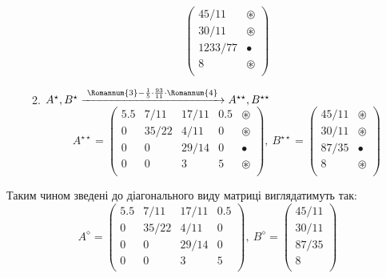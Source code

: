 \documentclass[a4paper,14pt]{extarticle} %
\begin{document}
\begin{enumerate}[Крок 1:]
\begin{enumerate}
\[\begin{pmatrix}
                45/11 & \circledast \\
                30/11 & \circledast \\
                1233/77 & \bullet \\
                8 & \circledast \\
            \end{pmatrix}
        \]
        \item $ A^{\star},B^{\star} \xrightarrow[]{\text{ \Romannum{3}}-\frac{1}{5}\cdot\frac{93}{11}\cdot\text{\Romannum{4} }} A^{\star\star},B^{\star\star} $
        \[ A^{\star\star} =
            \begin{pmatrix}
                5.5 & 7/11 & 17/11 & 0.5 & \circledast \\
                0 & 35/22 & 4/11 & 0 & \circledast \\
                0 & 0 & 29/14 & 0 & \bullet \\
                0 & 0 & 3 & 5 & \circledast \\
            \end{pmatrix},\
            B^{\star\star} = 
            \begin{pmatrix}
                45/11 & \circledast \\
                30/11 & \circledast \\
                87/35 & \bullet \\
                8 & \circledast \\
            \end{pmatrix}
        \]
    \end{enumerate}
\end{enumerate}

Таким чином зведені до діагонального виду матриці виглядатимуть так:
\begin{equation} A^{\diamond} =
    \begin{pmatrix}
        5.5 & 7/11 & 17/11 & 0.5 \\
        0 & 35/22 & 4/11 & 0 \\
        0 & 0 & 29/14 & 0 \\
        0 & 0 & 3 & 5 \\
    \end{pmatrix},\
    B^{\diamond} = 
    \begin{pmatrix}
        45/11 \\
        30/11 \\
        87/35 \\
        8 \\
    \end{pmatrix} \label{diagonal}
\end{equation}
\end{document}
